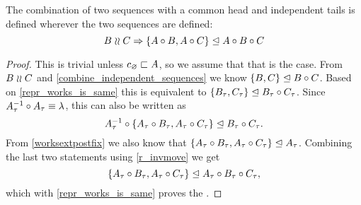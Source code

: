 \begin{mylem}\label{indep_prefix_combine}
The combination of two sequences with a common head and independent tails 
is defined wherever the two sequences are defined:
\[ B\mathrel{\wr\wr} C \Rightarrow {\{{A\circ B, A\circ C}\}}\trianglelefteq{A\circ B\circ C} \]
\end{mylem}
\begin{proof}
This is trivial unless $c_\varnothing\sqsubset{A}$, so we assume that that is the case.
From $B\mathrel{\wr\wr} C$ and \cref{combine_independent_sequences} we know
${\{{B, C}\}}\trianglelefteq{B\circ C}$.
Based on \cref{repr_works_is_same} this is equivalent to
${\{{{B}_\tau, {C}_\tau}\}}\trianglelefteq{{B}_\tau\circ{C}_\tau}$.
Since ${A}_\tau^{-1}\circ {A}_\tau \equiv \lambda$, this can also be written as
\[{{A}_\tau^{-1}\circ\{{A}_\tau\circ {B}_\tau, {A}_\tau\circ {C}_\tau\}}\trianglelefteq{{B}_\tau\circ{C}_\tau}.\]
From \cref{worksextpostfix} we also know that
${\{{{A}_\tau\circ {B}_\tau, {A}_\tau\circ {C}_\tau}\}}\trianglelefteq{{A}_\tau}$.
Combining the last two statements using \cref{r_invmove}
we get
\[ {\{{{A}_\tau\circ {B}_\tau, {A}_\tau\circ {C}_\tau}\}}\trianglelefteq{{A}_\tau\circ{B}_\tau\circ{C}_\tau}, \]
which with \cref{repr_works_is_same} proves the
.
\end{proof}

